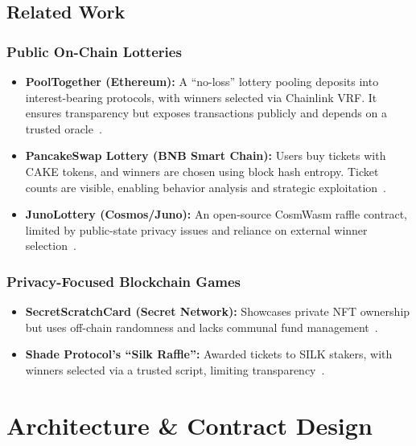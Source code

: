 \documentclass{article}
\begin{document}
\subsection{Related Work}

\subsubsection{Public On-Chain Lotteries}
\begin{itemize}
  \item \textbf{PoolTogether (Ethereum):} A ``no-loss'' lottery pooling deposits into interest-bearing protocols, with winners selected via Chainlink VRF. It ensures transparency but exposes transactions publicly and depends on a trusted oracle~\cite{PoolTogether}.
  \item \textbf{PancakeSwap Lottery (BNB Smart Chain):} Users buy tickets with CAKE tokens, and winners are chosen using block hash entropy. Ticket counts are visible, enabling behavior analysis and strategic exploitation~\cite{PancakeSwap}.
  \item \textbf{JunoLottery (Cosmos/Juno):} An open-source CosmWasm raffle contract, limited by public-state privacy issues and reliance on external winner selection~\cite{JunoLottery}.
\end{itemize}

\subsubsection{Privacy-Focused Blockchain Games}
\begin{itemize}
  \item \textbf{SecretScratchCard (Secret Network):} Showcases private NFT ownership but uses off-chain randomness and lacks communal fund management~\cite{SecretScratchCard}.
  \item \textbf{Shade Protocol's ``Silk Raffle'':} Awarded tickets to SILK stakers, with winners selected via a trusted script, limiting transparency~\cite{ShadeRaffle}.
\end{itemize}

\section{Architecture \& Contract Design}
\end{document}

